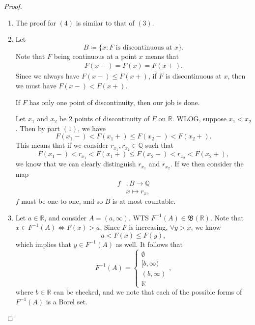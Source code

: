 \documentclass[notoc,notitlepage]{tufte-book}
\begin{document}
\begin{proof}
\begin{enumerate}
    \item The proof for $(4)$ is similar to that of $(3)$.
    \item Let
      \begin{equation*}
        B \coloneqq \{ x : F \text{ is discontinuous at } x \}.
      \end{equation*}
      Note that $F$ being continuous at a point $x$ means that
      \begin{gather*}
        F(x-) = F(x) = F(x+).
      \end{gather*}
      Since we always have $F(x-) \leq F(x+)$, if $F$ is
      discontinuous at $x$, then we must have $F(x-) < F(x+)$.

      If $F$ has only one point of discontinuity, then our job is done.

      Let $x_1$ and $x_2$ be 2 points of discontinuity of $F$ on $\mathbb{R}$.
      WLOG, suppose $x_1 < x_2$. Then by part $(1)$, we have
      \begin{equation*}
        F(x_1-) < F(x_1+) \leq F(x_2-) < F(x_2+).
      \end{equation*}
      This means that if we consider $r_{x_1}, r_{x_2} \in \mathbb{Q}$ such that
      \begin{equation*}
        F(x_1-) < r_{x_1} < F(x_1+) \leq F(x_2-) < r_{x_2} < F(x_2+),
      \end{equation*}
      we know that we can clearly distinguish $r_{x_1}$ and $r_{x_2}$.
      If we then consider the map
      \begin{align*}
        f &: B \to \mathbb{Q} \\
          & x \mapsto r_x,
      \end{align*}
      $f$ must be one-to-one, and so $B$ is at most countable.

    \item Let $a \in \mathbb{R}$, and consider $A = (a, \infty)$.
      WTS $F^{-1}(A) \in \mathfrak{B}(\mathbb{R})$.
      Note that $x \in F^{-1}(A) \iff F(x) > a$.
      Since $F$ is increasing, $\forall y > x$, we know
      \begin{equation*}
        a < F(x) \leq F(y),
      \end{equation*}
      which implies that $y \in F^{-1}(A)$ as well.
      It follows that
      \begin{equation*}
        F^{-1}(A) = \begin{cases}
          \emptyset \\
          [b, \infty) \\
          (b, \infty) \\
          \mathbb{R}
        \end{cases},
      \end{equation*}
      where $b \in \mathbb{R}$ can be checked,
      and we note that each of the possible forms of $F^{-1}(A)$ is a Borel set.
  \end{enumerate}
\end{proof}
\end{document}
